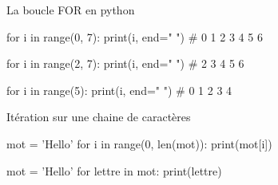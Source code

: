\def\level{Première}  %
\def\course{NSI}
\def\chaptername{Boucles FOR et WHILE} %
\def\docname{AP04-S}        %

\pagestyle{cours_FP}
\makeheader{} %



	\begin{easybox}{La boucle FOR en python}

				\begin{minipage}[b]{0.33\linewidth}
	\begin{CodePythontexAlt}[TaillePolice=\normalsize, Largeur=1\linewidth,Centre,PremLigne=1, Lignes=true,]{}
for i in range(0, 7):
	print(i, end=" ")
# 0 1 2 3 4 5 6
	
				\end{CodePythontexAlt}
		\end{minipage}\hfill
		\begin{minipage}[b]{0.33\linewidth}
	\begin{CodePythontexAlt}[TaillePolice=\normalsize, Largeur=1\linewidth,Centre,PremLigne=1, Lignes=true,]{}
for i in range(2, 7):
	print(i, end=" ")
# 2 3 4 5 6
					
				\end{CodePythontexAlt}
		\end{minipage}\hfill
		 \begin{minipage}[b]{0.33\linewidth}
	\begin{CodePythontexAlt}[TaillePolice=\normalsize, Largeur=1\linewidth,Centre,PremLigne=1, Lignes=true,]{}
for i in range(5):
	print(i, end=" ")
# 0 1 2 3 4
	
				\end{CodePythontexAlt}
		\end{minipage}
	\end{easybox}
	
	\begin{easybox}{Itération sur une chaine de caractères}{}
	
	\begin{minipage}{0.48\linewidth}
	\begin{CodePythontexAlt}[TaillePolice=\normalsize, Largeur=1\linewidth,Centre,PremLigne=1]{}
	mot = 'Hello'
	for i in range(0, len(mot)):
		print(mot[i])
			
	\end{CodePythontexAlt}
	\end{minipage}\hfill
	\begin{minipage}{0.48\linewidth}
		\begin{CodePythontexAlt}[TaillePolice=\normalsize, Largeur=1\linewidth,Centre,PremLigne=1]{}
	mot = 'Hello'
	for lettre in mot:
		print(lettre)	
		\end{CodePythontexAlt}
	
	
	\end{minipage}
	\end{easybox}
		
